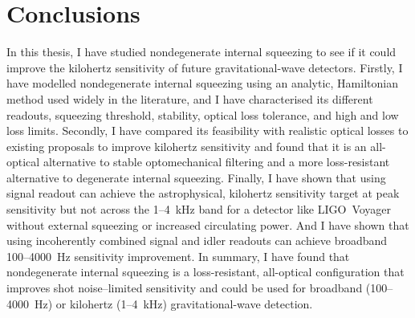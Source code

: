 \chapter{Conclusions}
\label{chp:future_work_and_conclusions}

In this thesis, I have studied nondegenerate internal squeezing to see if it could improve the kilohertz sensitivity of future gravitational-wave detectors.
Firstly, I have modelled nondegenerate internal squeezing using an analytic, Hamiltonian method used widely in the literature, and I have characterised its different readouts, squeezing threshold, stability, optical loss tolerance, and high and low loss limits.  Secondly, I have compared its feasibility with realistic optical losses to existing proposals to improve kilohertz sensitivity and found that it is an all-optical alternative to stable optomechanical filtering and a more loss-resistant alternative to degenerate internal squeezing. Finally, I have shown that using signal readout can achieve the astrophysical, kilohertz sensitivity target at peak sensitivity but not across the 1--4~kHz band for a detector like LIGO~Voyager without external squeezing or increased circulating power. And I have shown that using incoherently combined signal and idler readouts can achieve broadband 100--4000~Hz  sensitivity improvement.
In summary, I have found that nondegenerate internal squeezing is a loss-resistant, all-optical configuration that improves shot noise--limited sensitivity and could be used for broadband (100--4000~Hz) or kilohertz (1--4~kHz) gravitational-wave detection.

